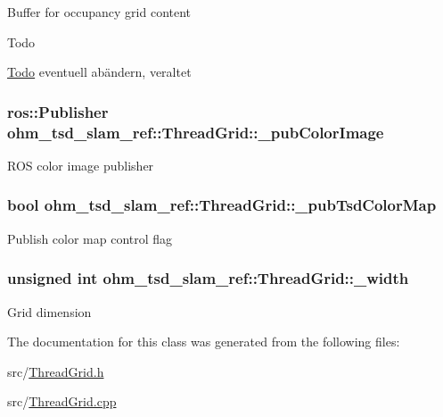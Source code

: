 Buffer for occupancy grid content \begin{DoxyRefDesc}{Todo}
\item[\hyperlink{todo__todo000019}{Todo}]eventuell abändern, veraltet \end{DoxyRefDesc}
\hypertarget{classohm__tsd__slam__ref_1_1ThreadGrid_a86ea0357d397f91ef76eb40389fb55e0}{
\subsubsection[{\-\_\-pub\-Color\-Image}]{\setlength{\rightskip}{0pt plus 5cm}ros\-::\-Publisher ohm\-\_\-tsd\-\_\-slam\-\_\-ref\-::\-Thread\-Grid\-::\-\_\-pub\-Color\-Image\hspace{0.3cm}{\ttfamily [private]}}}\label{classohm__tsd__slam__ref_1_1ThreadGrid_a86ea0357d397f91ef76eb40389fb55e0}
R\-O\-S color image publisher \hypertarget{classohm__tsd__slam__ref_1_1ThreadGrid_a2b8fe225e961331b72894697f1a8b120}{
\subsubsection[{\-\_\-pub\-Tsd\-Color\-Map}]{\setlength{\rightskip}{0pt plus 5cm}bool ohm\-\_\-tsd\-\_\-slam\-\_\-ref\-::\-Thread\-Grid\-::\-\_\-pub\-Tsd\-Color\-Map\hspace{0.3cm}{\ttfamily [private]}}}\label{classohm__tsd__slam__ref_1_1ThreadGrid_a2b8fe225e961331b72894697f1a8b120}
Publish color map control flag \hypertarget{classohm__tsd__slam__ref_1_1ThreadGrid_a4e18fa3923e4a016ad2ca963ccd318d7}{
\subsubsection[{\-\_\-width}]{\setlength{\rightskip}{0pt plus 5cm}unsigned int ohm\-\_\-tsd\-\_\-slam\-\_\-ref\-::\-Thread\-Grid\-::\-\_\-width\hspace{0.3cm}{\ttfamily [private]}}}\label{classohm__tsd__slam__ref_1_1ThreadGrid_a4e18fa3923e4a016ad2ca963ccd318d7}
Grid dimension 

The documentation for this class was generated from the following files\-:\begin{DoxyCompactItemize}
\item 
src/\hyperlink{ThreadGrid_8h}{Thread\-Grid.\-h}\item 
src/\hyperlink{ThreadGrid_8cpp}{Thread\-Grid.\-cpp}\end{DoxyCompactItemize}
